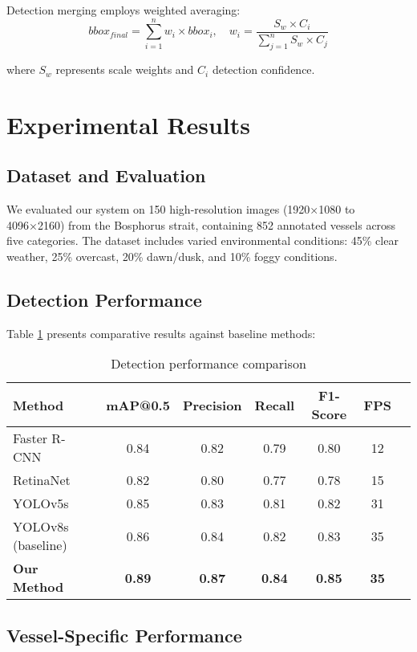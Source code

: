 \documentclass[10pt]{article}
\begin{document}
Detection merging employs weighted averaging:
\begin{equation}
bbox_{final} = \sum_{i=1}^{n} w_i \times bbox_i, \quad w_i = \frac{S_w \times C_i}{\sum_{j=1}^{n}S_w \times C_j}
\end{equation}

where $S_w$ represents scale weights and $C_i$ detection confidence.

\section{Experimental Results}

\subsection{Dataset and Evaluation}

We evaluated our system on 150 high-resolution images (1920×1080 to 4096×2160) from the Bosphorus strait, containing 852 annotated vessels across five categories. The dataset includes varied environmental conditions: 45\% clear weather, 25\% overcast, 20\% dawn/dusk, and 10\% foggy conditions.

\subsection{Detection Performance}

Table \ref{tab:performance} presents comparative results against baseline methods:

\begin{table}[ht]
\centering
\caption{Detection performance comparison}
\label{tab:performance}
\begin{tabular}{lcccccc}
\toprule
Method & mAP@0.5 & Precision & Recall & F1-Score & FPS \\
\midrule
Faster R-CNN & 0.84 & 0.82 & 0.79 & 0.80 & 12 \\
RetinaNet & 0.82 & 0.80 & 0.77 & 0.78 & 15 \\
YOLOv5s & 0.85 & 0.83 & 0.81 & 0.82 & 31 \\
YOLOv8s (baseline) & 0.86 & 0.84 & 0.82 & 0.83 & 35 \\
\textbf{Our Method} & \textbf{0.89} & \textbf{0.87} & \textbf{0.84} & \textbf{0.85} & \textbf{35} \\
\bottomrule
\end{tabular}
\end{table}

\subsection{Vessel-Specific Performance}
\end{document}
